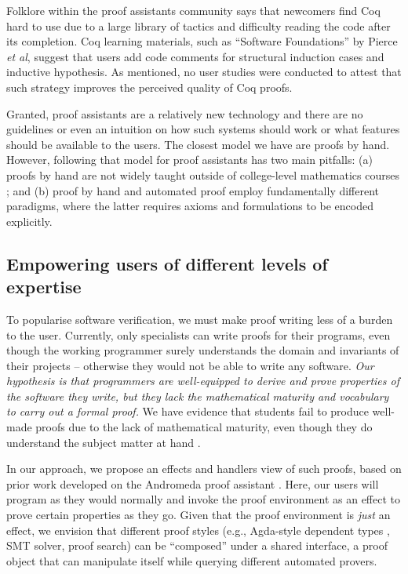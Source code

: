\documentclass[sigconfl]{acmart}
\begin{document}
Folklore within the proof assistants community says that newcomers
find Coq hard to use due to a large library of tactics and difficulty reading
the code after its completion. Coq learning materials, such as ``Software
Foundations'' by Pierce \textit{et al},  suggest that users
add code comments for structural induction cases and inductive hypothesis. As
mentioned, no user studies were conducted to attest that such strategy improves
the perceived quality of Coq proofs.

Granted, proof assistants are a relatively new technology
and there are no guidelines or even an intuition on how such systems should
work or what features should be available to the users. The closest model we
have are proofs by hand. However, following that model for proof assistants has
two main pitfalls: (a) proofs by hand are not widely taught outside of
college-level mathematics courses \cite{Anapa2010}; and (b) proof by hand and automated proof
employ fundamentally different paradigms, where the latter requires
axioms and formulations to be encoded explicitly.

\subsection{Empowering users of different levels of expertise}

To popularise software verification, we must make proof writing less of a
burden to the user. Currently, only specialists can write proofs for their
programs, even though the working programmer surely understands the domain and
invariants of their projects -- otherwise they would not be able to write any
software. \textit{Our hypothesis is that programmers are well-equipped to derive and
prove properties of the software they write, but they lack the mathematical maturity and
vocabulary to carry out a formal proof.} We have evidence that students fail to
produce well-made proofs due to the lack of mathematical maturity, even though
they do understand the subject matter at hand \cite{Knobelsdorf2017, Knobelsdorf2016}.

In our approach, we propose an effects and handlers view of such
proofs, based on prior work developed on the Andromeda proof assistant \cite{Bauer2018}. Here,
our users will program as they would normally and invoke
the proof environment as an effect to prove certain properties as they go. Given
that the proof environment is \textit{just} an effect, we envision that different proof
styles (e.g., Agda-style dependent types , SMT solver, proof search) can be ``composed''
under a shared interface, a proof object that can manipulate itself while
querying different automated provers.
\end{document}

